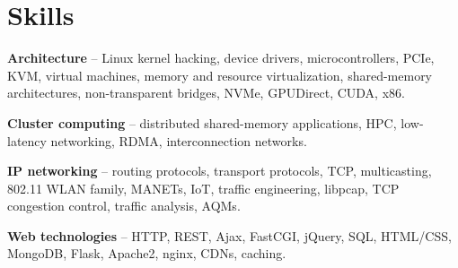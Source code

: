 
\section{Skills}
\begin{small}
	\parbox[t][][t]{\linewidth}{
		\textbf{Architecture} -- Linux kernel hacking, device drivers,
		microcontrollers,
		PCIe, KVM, virtual machines, memory and resource virtualization,
		shared-memory architectures, non-transparent bridges, 
		NVMe, GPUDirect, CUDA, x86.
		\smallbreak
	}
	\parbox[t][][t]{\linewidth}{
		\textbf{Cluster computing} -- distributed shared-memory applications, HPC, low-latency
		networking, RDMA, interconnection networks.
		\smallbreak
	}
	\parbox[t][][t]{\linewidth}{
		\textbf{IP networking} -- routing protocols, transport protocols, TCP,
		multicasting, 802.11 WLAN family, MANETs, IoT,  
		traffic engineering, libpcap, TCP congestion control, traffic
		analysis, AQMs. 
		\smallbreak
	}
	\parbox[t][][t]{\linewidth}{
		\textbf{Web technologies} -- HTTP, REST, Ajax, FastCGI, jQuery, 
		SQL, HTML/CSS, MongoDB, Flask, Apache2, nginx, CDNs, caching.
	}
	\smallskip
\end{small}
